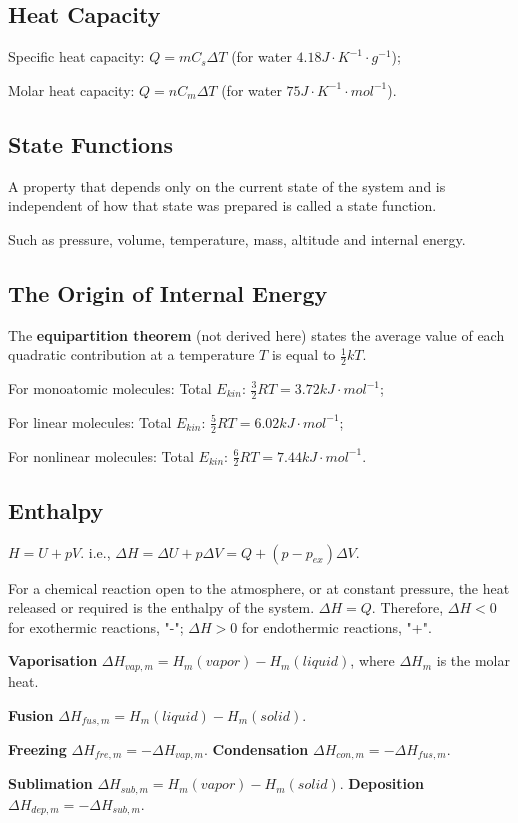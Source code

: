 \documentclass[a4paper,12pt]{article}
\begin{document}
\subsection{Heat Capacity}
Specific heat capacity: $Q = m C_{s} \Delta T$ (for water $4.18 J\cdot K^{-1}\cdot g^{-1}$);\par
Molar heat capacity: $Q = n C_{m} \Delta T$ (for water $75 J\cdot K^{-1}\cdot mol^{-1}$).
\subsection{State Functions}
A property that depends only on the current state of the system and is independent of how that state was prepared is called a state function.\par
Such as pressure, volume, temperature, mass, altitude and internal energy.
\subsection{The Origin of Internal Energy}
The \textbf{equipartition theorem} (not derived here) states the average value of each quadratic contribution at a temperature $T$ is equal to $\frac{1}{2}kT$.\par
For monoatomic molecules: Total $E_{kin}$: $\frac{3}{2}RT = 3.72 kJ\cdot mol^{-1}$;\par
For linear molecules: Total $E_{kin}$: $\frac{5}{2}RT = 6.02 kJ\cdot mol^{-1}$;\par
For nonlinear molecules: Total $E_{kin}$: $\frac{6}{2}RT = 7.44 kJ\cdot mol^{-1}$.
\subsection{Enthalpy}
$H = U + pV$. i.e., $\Delta H =\Delta U + p\Delta V=Q+(p-p_{ex})\Delta V$.\par
For a chemical reaction open to the atmosphere, or at constant pressure, the heat released or required is the enthalpy of the system. $\Delta H=Q$. Therefore, $\Delta H<0$ for exothermic reactions, "-"; $\Delta H>0$ for endothermic reactions, "+".\par
\textbf{Vaporisation} $\Delta H_{vap,m} = H_{m}(vapor) - H_{m}(liquid)$, where $\Delta H_{m}$ is the molar heat.\par
\textbf{Fusion} $\Delta H_{fus,m} = H_{m}(liquid) - H_{m}(solid)$.\par
\textbf{Freezing} $\Delta H_{fre,m} =-\Delta H_{vap,m}$. \textbf{Condensation} $\Delta H_{con,m} =-\Delta H_{fus,m}$.\par
\textbf{Sublimation}  $\Delta H_{sub,m} = H_{m}(vapor) - H_{m}(solid)$. \textbf{Deposition}  $\Delta H_{dep,m} = -\Delta H_{sub,m}$.
\end{document}
